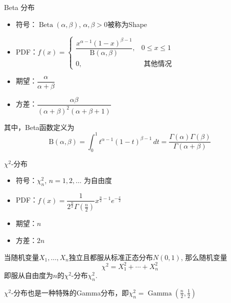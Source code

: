 
\begin{frame}

\begin{block}{Beta 分布}
\begin{itemize}
\item 符号：$\operatorname{Beta}(\alpha,\beta)$, $\alpha,\beta > 0$被称为Shape
\item PDF：$f(x) = \begin{cases}
\dfrac{x^{\alpha-1} (1-x)^{\beta-1}}{\mathrm{B}(\alpha,\beta)}, & 0 \le x \le 1 \\
0, & \text{ 其他情况}
\end{cases}$
\item 期望：$\dfrac{\alpha}{\alpha+\beta}$
\item 方差：$\dfrac{\alpha\beta}{(\alpha+\beta)^2(\alpha+\beta+1)}$
\end{itemize}
\end{block}

其中，Beta函数定义为
\[\mathrm{B} (\alpha,\beta) = \int _{0}^{1}t^{\alpha-1}(1-t)^{\beta-1}\,dt = \dfrac{\Gamma(\alpha)\Gamma(\beta)}{\Gamma(\alpha+\beta)}\]

\end{frame}


\begin{frame}

\begin{block}{$\chi^2$-分布}
\begin{itemize}
\item 符号：$\chi^2_n$, \; $n = 1,2,\ldots$ 为自由度
\item PDF：$f(x) = \dfrac{1}{2^{\frac{n}{2}} \Gamma(\frac{n}{2})} x^{\frac{n}{2}-1} e^{-\frac{x}{2}}$
\item 期望：$n$
\item 方差：$2n$
\end{itemize}

\vspace{1em}
\pause

当随机变量$X_1,\ldots,X_n$独立且都服从标准正态分布$N(0,1)$, 那么随机变量
\[\chi^2 = X_1^2 + \cdots + X_n^2\]
即服从自由度为$n$的$\chi^2$-分布$\chi^2_n$.

\vspace{1em}

$\chi^2$-分布也是一种特殊的Gamma分布，即$\chi^2_n = \operatorname{Gamma}(\frac{n}{2},\frac{1}{2})$
\end{block}

\end{frame}

